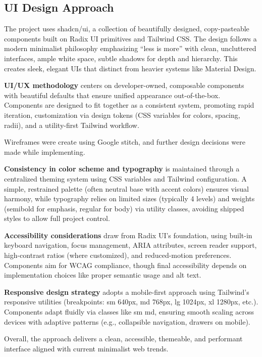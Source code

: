 \subsection{UI Design Approach}

The project uses shadcn/ui, a collection of beautifully designed, copy-pasteable components built on Radix UI primitives and Tailwind CSS. The design follows a modern minimalist philosophy emphasizing ``less is more'' with clean, uncluttered interfaces, ample white space, subtle shadows for depth and hierarchy. This creates sleek, elegant UIs that distinct from heavier systems like Material Design.

\textbf{UI/UX methodology} centers on developer-owned, composable components with beautiful defaults that ensure unified appearance out-of-the-box. Components are designed to fit together as a consistent system, promoting rapid iteration, customization via design tokens (CSS variables for colors, spacing, radii), and a utility-first Tailwind workflow.

Wireframes were create using Google stitch, and further design decisions were made while implementing.

\textbf{Consistency in color scheme and typography} is maintained through a centralized theming system using CSS variables and Tailwind configuration. A simple, restrained palette (often neutral base with accent colors) ensures visual harmony, while typography relies on limited sizes (typically 4 levels) and weights (semibold for emphasis, regular for body) via utility classes, avoiding shipped styles to allow full project control.

\textbf{Accessibility considerations} draw from Radix UI's foundation, using built-in keyboard navigation, focus management, ARIA attributes, screen reader support, high-contrast ratios (where customized), and reduced-motion preferences. Components aim for WCAG compliance, though final accessibility depends on implementation choices like proper semantic usage and alt text.

\textbf{Responsive design strategy} adopts a mobile-first approach using Tailwind's responsive utilities (breakpoints: sm 640px, md 768px, lg 1024px, xl 1280px, etc.). Components adapt fluidly via classes like sm md, ensuring smooth scaling across devices with adaptive patterns (e.g., collapsible navigation, drawers on mobile).

Overall, the approach delivers a clean, accessible, themeable, and performant interface aligned with current minimalist web trends.


